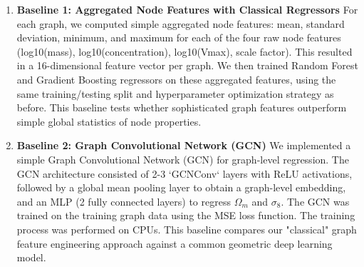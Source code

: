 \documentclass[twocolumn]{aastex631}
\begin{document}
\begin{enumerate}
    \item \textbf{Baseline 1: Aggregated Node Features with Classical Regressors}
    For each graph, we computed simple aggregated node features: mean, standard deviation, minimum, and maximum for each of the four raw node features (log10(mass), log10(concentration), log10(Vmax), scale factor). This resulted in a 16-dimensional feature vector per graph. We then trained Random Forest and Gradient Boosting regressors on these aggregated features, using the same training/testing split and hyperparameter optimization strategy as before. This baseline tests whether sophisticated graph features outperform simple global statistics of node properties.

    \item \textbf{Baseline 2: Graph Convolutional Network (GCN)}
    We implemented a simple Graph Convolutional Network (GCN) for graph-level regression. The GCN architecture consisted of 2-3 `GCNConv` layers with ReLU activations, followed by a global mean pooling layer to obtain a graph-level embedding, and an MLP (2 fully connected layers) to regress $\Omega_m$ and $\sigma_8$. The GCN was trained on the training graph data using the MSE loss function. The training process was performed on CPUs. This baseline compares our "classical" graph feature engineering approach against a common geometric deep learning model.
\end{enumerate}
\end{document}
